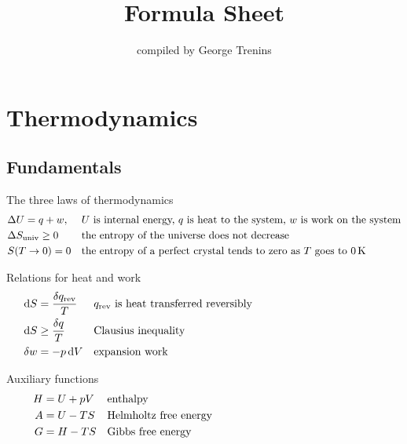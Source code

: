 \documentclass[11pt,a4paper,twoside]{article}
\title{\bfseries%
Formula Sheet}
\author{
compiled by George Trenins}
\makeatletter
\numberwithin{equation}{section}
\def\maketitle{
    \begingroup
    \centering
    \bfseries
    \ifx\@title\@empty\else
        \LARGE \@title \par \vskip 5pt %
    \fi
	\normalfont
    \ifx\@author\@empty\else
        \vskip 2pt %
        \large \@author \par
    \fi
    \endgroup
    \vskip 5pt %
}
\makeatother
\begin{document}
\abovedisplayskip=12pt
\belowdisplayskip=12pt
\abovedisplayshortskip=0pt
\belowdisplayshortskip=0pt
\allowdisplaybreaks
\maketitle
\setlength{\parindent}{0pt}



\section{Thermodynamics}

\subsection{Fundamentals}

The three laws of thermodynamics
\begin{align}
	& \Delta U = q + w, & & U \text{ is internal energy, } q \text{ is heat to the system, } w \text{ is work on the system} \\
    & \Delta S_{\text{univ}} \geq 0 & & \text{the entropy of the universe does not decrease }  \\
    & S(T \to 0)  = 0 & & \text{the entropy of a perfect crystal tends to zero as $T$ goes to \SI{0}{\kelvin}} 
\end{align}

Relations for heat and work
\begin{align}
    \dd{S} & = \frac{\delta q_{\text{rev}}}{T} 
        & & q_{\text{rev}} \text{ is heat transferred reversibly} \hspace*{0.35\columnwidth}  \\
    \dd{S} & \geq \frac{\delta q}{T} 
        & & \text{Clausius inequality} \\
    \delta w & = - p \dd{V} 
        & & \text{expansion work}
\end{align}

Auxiliary functions
\begin{align}
    H & = U + p V 
    & & \text{enthalpy} \hspace*{0.6\columnwidth}  \\
    A & = U - T S 
    & & \text{Helmholtz free energy} \\
    G & = H - T S 
    & & \text{Gibbs free energy}
\end{align}
\end{document}
